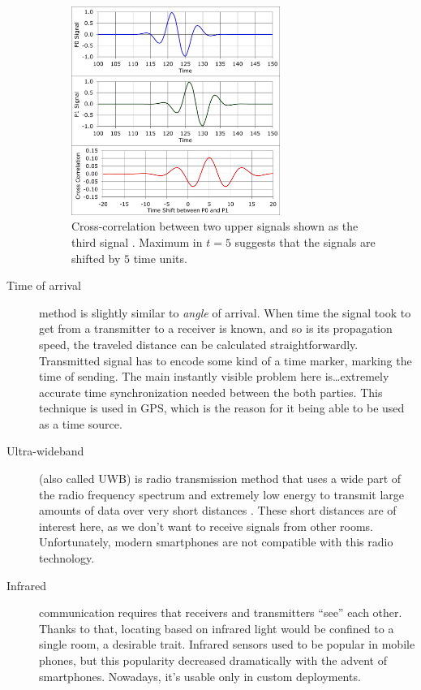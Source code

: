 \begin{description}
	\begin{figure}[h]
		\centering
		\includegraphics[width=0.67\textwidth]{cross-corr-pulse}
		\caption{Cross-correlation between two upper signals shown as the third signal \cite{wiki:cross-corr-pulse}. Maximum in $t=5$ suggests that the signals are shifted by $5$ time units.}
		\label{fig:cross-corr-pulse}
	\end{figure}
	
	\item[Time of arrival] method is slightly similar to \emph{angle} of arrival. When time the signal took to get from a transmitter to a receiver is known, and so is its propagation speed, the traveled distance can be calculated straightforwardly. Transmitted signal has to encode some kind of a time marker, marking the time of sending. The main instantly visible problem here is\ldots extremely accurate time synchronization needed between the both parties. This technique is used in GPS, which is the reason for it being able to be used as a time source.
	
	\item[Ultra-wideband] (also called UWB) is radio transmission method that uses a wide part of the radio frequency spectrum and extremely low energy to transmit large amounts of data over very short distances \cite{ultra-wideband}. These short distances are of interest here, as we don't want to receive signals from other rooms. Unfortunately, modern smartphones are not compatible with this radio technology.
	
	\item[Infrared] communication requires that receivers and transmitters ``see'' each other. Thanks to that, locating based on infrared light would be confined to a single room, a desirable trait. Infrared sensors used to be popular in mobile phones, but this popularity decreased dramatically with the advent of smartphones. Nowadays, it's usable only in custom deployments.
	

\end{description}
